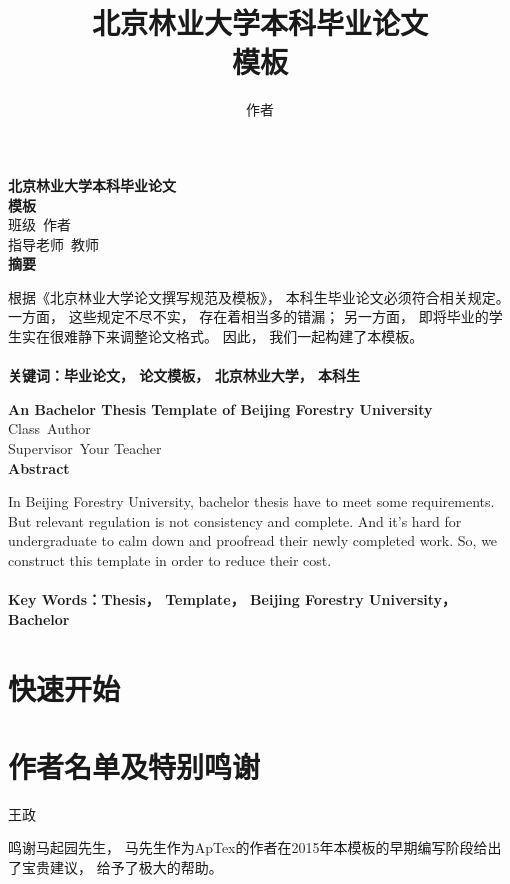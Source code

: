 \documentclass[UTF8]{ctexart}
\title{北京林业大学本科毕业论文\\模板}
\author{作者}
\numberwithin{figure}{section}
\numberwithin{equation}{section}
\begin{document}
\begin{titlepage}
\begin{center}
\textbf{北京林业大学本科毕业论文\\模板}\\
班级\ 作者\\
指导老师\ 教师\\
\textbf{摘要}
\end{center}
根据《北京林业大学论文撰写规范及模板》， 本科生毕业论文必须符合相关规定。 一方面， 这些规定不尽不实， 存在着相当多的错漏； 另一方面， 即将毕业的学生实在很难静下来调整论文格式。 因此， 我们一起构建了本模板。
\\\\
\textbf{关键词：毕业论文， 论文模板， 北京林业大学， 本科生}
\pagebreak
\begin{center}
\textbf{An Bachelor Thesis Template of Beijing Forestry University }\\
Class\ Author\\
Supervisor\ Your Teacher\\
\textbf{Abstract}
\end{center}

In Beijing Forestry University, bachelor thesis have to meet some requirements. But relevant regulation is not consistency and complete. And it's hard for undergraduate to calm down and proofread their newly completed work. So, we construct this template in order to reduce their cost. 
\\\\
\textbf{Key Words：Thesis， Template， Beijing Forestry University， Bachelor}
\end{titlepage}
\pagebreak

\tableofcontents
\pagebreak


\section{快速开始}
\cite{刘海洋2013LATEX}

\section{作者名单及特别鸣谢}
王政

鸣谢马起园先生， 马先生作为ApTex的作者在2015年本模板的早期编写阶段给出了宝贵建议， 给予了极大的帮助。


\end{document}

